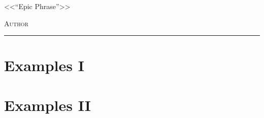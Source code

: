 \documentclass[12pt,a4paper]{book}
\begin{document}
\renewcommand{\contentsname}{\vspace{0cm} Contenido \vspace{-2cm}}
\begin{titlepage}
\vspace*{2cm}

\noindent
\vspace*{0.5cm}

\vspace{1.5cm}
\epigraph{<<``Epic Phrase''>>}%
{ \textsc{Author}}
\null\vfill
\vspace*{1cm}
\noindent
\hfill
\begin{minipage}{0.7\linewidth}
    \begin{flushright}
        \printauthor %
    \end{flushright}
\end{minipage}
%
\begin{minipage}{0.02\linewidth}
    \rule{1pt}{70pt}
\end{minipage}
\titlepagedecoration
\end{titlepage}


\blankpages
\let\cleardoublepage=\clearpage
\tableofcontents
\thispagestyle{empty}
\blankpages
\geomdoc %




\chapter{Examples I}

\newpage\thispagestyle{empty}\blankpage
\chapter{Examples II}



\blankpages


\nocite{*}
\end{document}

